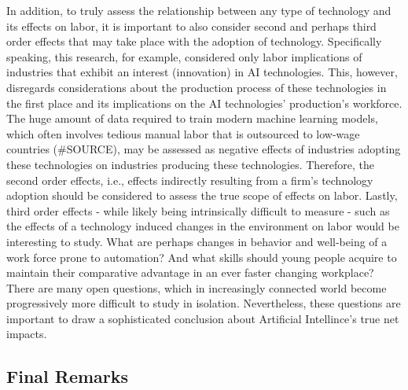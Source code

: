 \documentclass[
  11,
  a4paperpaper,
]{article}
\begin{document}
In addition, to truly assess the relationship between any type of
technology and its effects on labor, it is important to also consider
second and perhaps third order effects that may take place with the
adoption of technology. Specifically speaking, this research, for
example, considered only labor implications of industries that exhibit
an interest (innovation) in AI technologies. This, however, disregards
considerations about the production process of these technologies in the
first place and its implications on the AI technologies' production's
workforce. The huge amount of data required to train modern machine
learning models, which often involves tedious manual labor that is
outsourced to low-wage countries (\#SOURCE), may be assessed as negative
effects of industries adopting these technologies on industries
producing these technologies. Therefore, the second order effects, i.e.,
effects indirectly resulting from a firm's technology adoption should be
considered to assess the true scope of effects on labor. Lastly, third
order effects - while likely being intrinsically difficult to measure -
such as the effects of a technology induced changes in the environment
on labor would be interesting to study. What are perhaps changes in
behavior and well-being of a work force prone to automation? And what
skills should young people acquire to maintain their comparative
advantage in an ever faster changing workplace? There are many open
questions, which in increasingly connected world become progressively
more difficult to study in isolation. Nevertheless, these questions are
important to draw a sophisticated conclusion about Artificial
Intellince's true net impacts.

\subsection{Final Remarks}\label{final-remarks}
\end{document}
